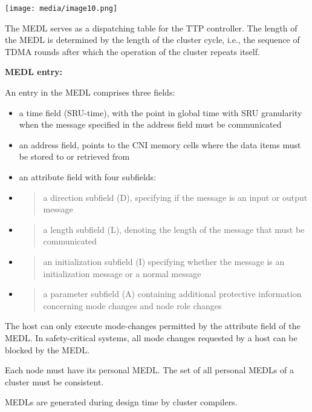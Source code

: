 \texttt{[image: media/image10.png]}

The MEDL serves as a dispatching table for the TTP controller. The
length of the MEDL is determined by the length of the cluster cycle,
i.e., the sequence of TDMA rounds after which the operation of the
cluster repeats itself.

\textbf{MEDL entry:}

An entry in the MEDL comprises three fields:

\begin{itemize}
\item
  a time field (SRU-time), with the point in global time with SRU
  granularity when the message specified in the address field must be
  communicated
\item
  an address field, points to the CNI memory cells where the data items
  must be stored to or retrieved from
\item
  an attribute field with four subfields:
\item
  \begin{quote}
  a direction subfield (D), specifying if the message is an input or
  output message
  \end{quote}
\item
  \begin{quote}
  a length subfield (L), denoting the length of the message that must be
  communicated
  \end{quote}
\item
  \begin{quote}
  an initialization subfield (I) specifying whether the message is an
  initialization message or a normal message
  \end{quote}
\item
  \begin{quote}
  a parameter subfield (A) containing additional protective information
  concerning mode changes and node role changes
  \end{quote}
\end{itemize}

The host can only execute mode-changes permitted by the attribute field
of the MEDL. In safety-critical systems, all mode changes requested by a
host can be blocked by the MEDL.

Each node must have its personal MEDL. The set of all personal MEDLs of
a cluster must be consistent.

MEDLs are generated during design time by cluster compilers.

